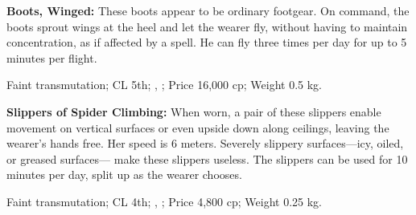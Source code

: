 
\textbf{Boots, Winged:} These boots appear to be ordinary footgear. On command, the boots sprout wings at the heel and let the wearer fly, without having to maintain concentration, as if affected by a  spell. He can fly three times per day for up to 5 minutes per flight.

Faint transmutation; CL 5th; , ; Price 16,000 cp; Weight 0.5 kg.





\textbf{Slippers of Spider Climbing:} When worn, a pair of these slippers enable movement on vertical surfaces or even upside down along ceilings, leaving the wearer's hands free. Her speed is 6 meters. Severely slippery surfaces---icy, oiled, or greased surfaces--- make these slippers useless. The slippers can be used for 10 minutes per day, split up as the wearer chooses.

Faint transmutation; CL 4th; , ; Price 4,800 cp; Weight 0.25 kg.

